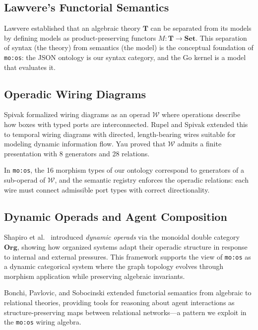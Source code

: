 \documentclass[submission,copyright,creativecommons]{eptcs}
\begin{document}
\subsection{Lawvere's Functorial Semantics}

Lawvere \cite{lawvere1963} established that an algebraic theory $\mathbf{T}$
can be separated from its models by defining models as product-preserving
functors $M\colon \mathbf{T} \to \mathbf{Set}$. This separation of syntax
(the theory) from semantics (the model) is the conceptual foundation of
\texttt{mo:os}: the JSON ontology is our syntax category, and the Go kernel is
a model that evaluates it.

\subsection{Operadic Wiring Diagrams}

Spivak \cite{spivak2013} formalized wiring diagrams as an operad
$\mathcal{W}$ where operations describe how boxes with typed ports are
interconnected. Rupel and Spivak \cite{spivak2013operad} extended this to
temporal wiring diagrams with directed, length-bearing wires suitable for
modeling dynamic information flow. Yau \cite{yau2018} proved that
$\mathcal{W}$ admits a finite presentation with 8 generators and 28 relations.

In \texttt{mo:os}, the 16 morphism types of our ontology correspond to
generators of a sub-operad of $\mathcal{W}$, and the semantic registry
enforces the operadic relations: each wire must connect admissible port types
with correct directionality.

\subsection{Dynamic Operads and Agent Composition}

Shapiro et al.\ \cite{shapiro2022} introduced \emph{dynamic operads} via the
monoidal double category $\mathbf{Org}$, showing how organized systems adapt
their operadic structure in response to internal and external pressures. This
framework supports the view of \texttt{mo:os} as a dynamic categorical system
where the graph topology evolves through morphism application while preserving
algebraic invariants.

Bonchi, Pavlovic, and Sobocinski \cite{bonchi2017functorial} extended
functorial semantics from algebraic to relational theories, providing tools for
reasoning about agent interactions as structure-preserving maps between
relational networks---a pattern we exploit in the \texttt{mo:os} wiring
algebra.
\end{document}
